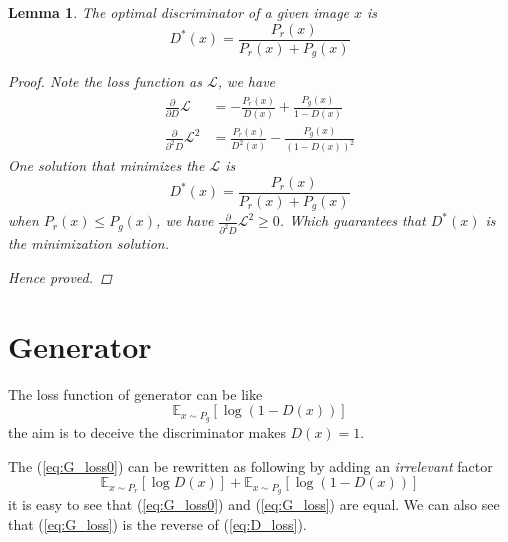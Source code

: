 \documentclass[a4paper]{article}
\newtheorem{lemma}{Lemma}[section]
\begin{document}
\begin{lemma}
    The optimal discriminator of a given image $x$ is
    \begin{equation*}
        D^*(x) = \frac{P_r(x)}{P_r(x) + P_g(x)}
    \end{equation*}

    \begin{proof}
        Note the loss function as $\mathcal{L}$, we have
        \begin{equation*}
            \begin{aligned}
                \frac{\partial}{\partial D} \mathcal{L}     & =
                - \frac{P_r(x)}{D(x)}
                + \frac{P_g(x)}{1-D(x)}                         \\
                \frac{\partial}{\partial^2 D} \mathcal{L}^2 & =
                \frac{P_r(x)}{D^2(x)}
                - \frac{P_g(x)}{(1-D(x))^2}
            \end{aligned}
        \end{equation*}
        One solution that minimizes the $\mathcal{L}$ is
        \begin{equation*}
            D^*(x) = \frac{P_r(x)}{P_r(x) + P_g(x)}
        \end{equation*}
        when $P_r(x) \leqslant P_g(x)$, we have $\frac{\partial}{\partial^2 D} \mathcal{L}^2 \geqslant 0$.
        Which guarantees that $D^*(x)$ is the minimization solution.

        Hence proved.
    \end{proof}
\end{lemma}

\section{Generator}
The loss function of generator can be like
\begin{equation}
    \mathbb{E}_{x\sim P_g} [\log{(1-D(x))}]
    \label{eq:G_loss0}
\end{equation}
the aim is to deceive the discriminator makes $D(x) = 1$.

The (\ref{eq:G_loss0}) can be rewritten as following by adding an \emph{irrelevant} factor
\begin{equation}
    \mathbb{E}_{x\sim P_r} [\log{D(x)}]
    + \mathbb{E}_{x\sim P_g} [\log{(1-D(x))}]
    \label{eq:G_loss}
\end{equation}
it is easy to see that (\ref{eq:G_loss0}) and (\ref{eq:G_loss}) are equal.
We can also see that (\ref{eq:G_loss}) is the reverse of (\ref{eq:D_loss}).
\end{document}
